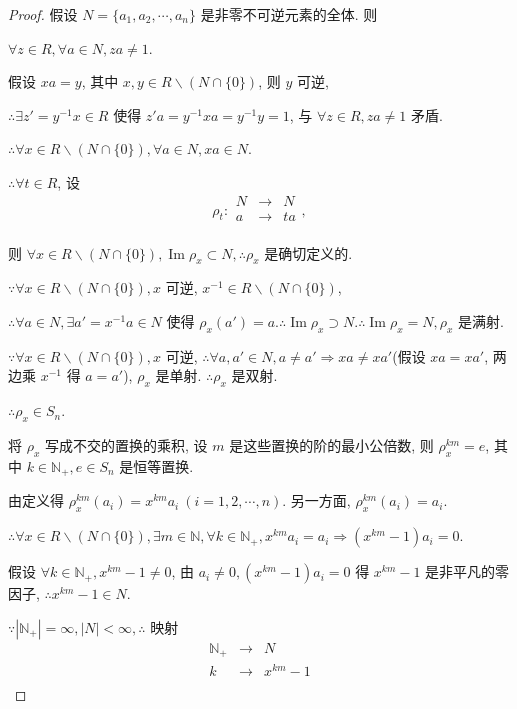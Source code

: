 \documentclass{ctexart}
\begin{document}
\begin{proof}
    假设 $N=\{a_1,a_2,\cdots,a_n\}$ 是非零不可逆元素的全体. 则

    $\forall z\in R,\forall a\in N,za\neq 1$.

    假设 $xa=y$, 其中 $x,y\in R\backslash(N\cap\{0\})$, 则 $y$ 可逆,

    $\therefore\exists z'=y^{-1}x\in R$ 使得 $z'a=y^{-1}xa=y^{-1}y=1$, 与 $\forall z\in R,za\neq1$ 矛盾.

    $\therefore\forall x\in R\backslash(N\cap\{0\}),\forall a\in N,xa\in N$.

    $\therefore\forall t\in R$, 设
    \[\rho_t:\begin{array}{rcl}
        N & \to & N \\
        a & \to & ta \\
    \end{array},\]

    则 $\forall x\in R\backslash(N\cap\{0\}),\operatorname{Im}\rho_x\subset N,\therefore\rho_x$ 是确切定义的.

    $\because\forall x\in R\backslash(N\cap\{0\}),x$ 可逆, $x^{-1}\in R\backslash(N\cap\{0\})$,

    $\therefore\forall a\in N,\exists a'=x^{-1}a\in N$ 使得 $\rho_x(a')=a.\therefore\operatorname{Im}\rho_x\supset N.\therefore\operatorname{Im}\rho_x=N,\rho_x$ 是满射.

    $\because\forall x\in R\backslash(N\cap\{0\}),x$ 可逆, $\therefore\forall a,a'\in N,a\neq a'\Rightarrow xa\neq xa'$(假设 $xa=xa'$, 两边乘 $x^{-1}$ 得 $a=a'$), $\rho_x$ 是单射. $\therefore\rho_x$ 是双射.

    $\therefore\rho_x\in S_n$.

    将 $\rho_x$ 写成不交的置换的乘积, 设 $m$ 是这些置换的阶的最小公倍数, 则 $\rho_x^{km}=e$, 其中 $k\in\mathbb{N}_+,e\in S_n$ 是恒等置换.

    由定义得 $\rho_x^{km}(a_i)=x^{km}a_i\ (i=1,2,\cdots,n)$. 另一方面, $\rho_x^{km}(a_i)=a_i$.

    $\therefore\forall x\in R\backslash(N\cap\{0\}),\exists m\in\mathbb{N},\forall k\in\mathbb{N}_+,x^{km}a_i=a_i\Rightarrow(x^{km}-1)a_i=0$.

    假设 $\forall k\in\mathbb{N}_+,x^{km}-1\neq0$, 由 $a_i\neq0,(x^{km}-1)a_i=0$ 得 $x^{km}-1$ 是非平凡的零因子, $\therefore x^{km}-1\in N$.
    
    $\because|\mathbb{N}_+|=\infty,|N|<\infty,\therefore$ 映射
    \[\begin{array}{rcl}
        \mathbb{N}_+ & \to & N \\
        k & \to & x^{km}-1 \\
    \end{array}\]


\end{proof}
\end{document}
